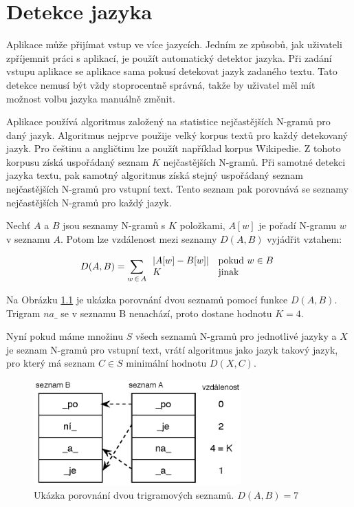 \chapter{Detekce jazyka}
\label{chap:detekce_jazyka}

Aplikace může přijímat vstup ve více jazycích. Jedním ze způsobů, jak uživateli zpříjemnit práci s aplikací, je použít automatický detektor jazyka. Při zadání vstupu aplikace se aplikace sama pokusí detekovat jazyk zadaného textu. Tato detekce nemusí být vždy stoprocentně správná, takže by uživatel měl mít možnost volbu jazyka manuálně změnit.

Aplikace používá algoritmus založený na statistice nejčastějších N-gramů pro daný jazyk\cite{cavnar}. Algoritmus nejprve použije velký korpus textů pro každý detekovaný jazyk. Pro češtinu a angličtinu lze použít například korpus Wikipedie. Z tohoto korpusu získá uspořádaný seznam $K$ nejčastějších N-gramů. Při samotné detekci jazyka textu, pak samotný algoritmus získá stejný uspořádaný seznam nejčastějších N-gramů pro vstupní text. Tento seznam pak porovnává se seznamy nejčastějších N-gramů pro každý jazyk.

Nechť $A$ a $B$ jsou seznamy N-gramů s $K$ položkami, $A[w]$ je pořadí N-gramu $w$ v seznamu $A$. Potom lze vzdálenost mezi seznamy $D(A,B)$ vyjádřit vztahem:

\begin{equation}
  D(A, B) = \sum_{w\,\in\,A} \begin{array}{l l} |A[w] - B[w]| & \mathrm{pokud}\ w \in B \\
  K & \mathrm{jinak} \end{array}
\end{equation}

Na Obrázku \ref{fig:detekce_jazyka} je ukázka porovnání dvou seznamů pomocí funkce $D(A,B)$. Trigram $na\_$ se v seznamu B nenachází, proto dostane hodnotu $K = 4$.

Nyní pokud máme množinu $S$ všech seznamů N-gramů pro jednotlivé jazyky a $X$ je seznam N-gramů pro vstupní text, vrátí algoritmus jako jazyk takový jazyk, pro který má seznam $C \in S$ minimální hodnotu $D(X, C)$.


\begin{figure}[h]
  \centering
  \includegraphics[width=80mm]{detekce_jazyka.eps}
  \caption{Ukázka porovnání dvou trigramových seznamů. $D(A, B) = 7$}
  \label{fig:detekce_jazyka}
\end{figure}


